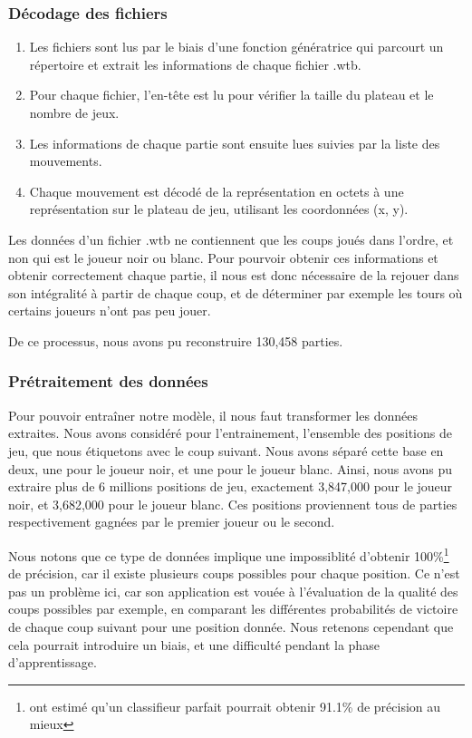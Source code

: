 \subsubsection{Décodage des fichiers}
\begin{enumerate}
    \item Les fichiers sont lus par le biais d'une fonction génératrice qui parcourt un répertoire et extrait les informations de chaque fichier .wtb.
    \item Pour chaque fichier, l'en-tête est lu pour vérifier la taille du plateau et le nombre de jeux.
    \item Les informations de chaque partie sont ensuite lues suivies par la liste des mouvements.
    \item Chaque mouvement est décodé de la représentation en octets à une représentation sur le plateau de jeu, utilisant les coordonnées (x, y).
\end{enumerate}

Les données d'un fichier .wtb ne contiennent que les coups joués dans l'ordre, et non qui est le joueur noir ou blanc. Pour pourvoir obtenir ces informations et obtenir correctement chaque partie, il nous est donc nécessaire de la rejouer dans son intégralité à partir de chaque coup, et de déterminer par exemple les tours où certains joueurs n'ont pas peu jouer.

De ce processus, nous avons pu reconstruire 130,458 parties.

\subsubsection{Prétraitement des données}
\label{subsubsec:preproc}
Pour pouvoir entraîner notre modèle, il nous faut transformer les données extraites. Nous avons considéré pour l'entrainement, l'ensemble des positions de jeu, que nous étiquetons avec le coup suivant. Nous avons séparé cette base en deux, une pour le joueur noir, et une pour le joueur blanc. Ainsi, nous avons pu extraire plus de 6 millions positions de jeu, exactement 3,847,000 pour le joueur noir, et 3,682,000 pour le joueur blanc. Ces positions proviennent tous de parties respectivement gagnées par le premier joueur ou le second. 

Nous notons que ce type de données implique une impossiblité d'obtenir 100\%\footnote{\cite{Liskowski_2018} ont estimé qu'un classifieur parfait pourrait obtenir 91.1\% de précision au mieux} de précision, car il existe plusieurs coups possibles pour chaque position. Ce n'est pas un problème ici, car son application est vouée à l'évaluation de la qualité des coups possibles par exemple, en comparant les différentes probabilités de victoire de chaque coup suivant pour une position donnée. Nous retenons cependant que cela pourrait introduire un biais, et une difficulté pendant la phase d'apprentissage.

